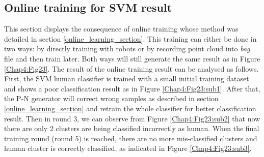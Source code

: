 


\subsection{Online training for SVM result}
\label{online_svm_result}

This section displays the consequence of online training whose method was detailed in 
section \ref{online_learning_section}. This training can either be done in two ways: by directly training with robots or by 
recording point cloud into \textit{bag} file and then train later. Both ways will still generate the same result as in 
Figure \ref{Chap4:Fig23}. The result of the online training result can be analysed as follows. First, the SVM human classifier is trained
with a small initial training dataset and shows a poor classification result as in Figure
\ref{Chap4:Fig23:sub1}. After that, the P-N generator will correct wrong samples as described in section 
\ref{online_learning_section} and retrain the whole classifier for better classification result. Then in round 3, we 
can observe from Figure \ref{Chap4:Fig23:sub2} that now there are only 2 clusters are being classified incorrectly as human. When the 
final training round (round 5) is reached, there are no more mis-classified clusters and human cluster is correctly classified, as indicated 
in Figure \ref{Chap4:Fig23:sub3}.

